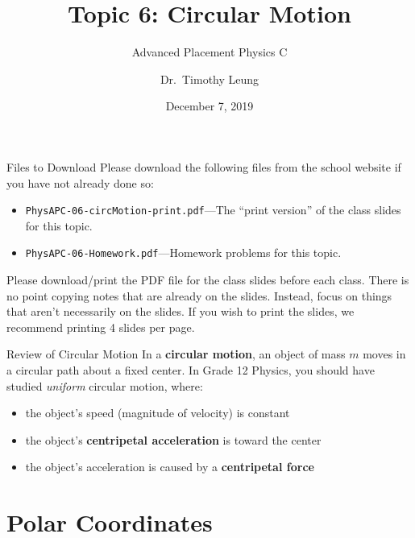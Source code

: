 \documentclass[12pt,compress,aspectratio=169]{beamer}
\title{Topic 6: Circular Motion}
\subtitle{Advanced Placement Physics C}
\author[TML]{Dr.\ Timothy Leung}
\institute{Olympiads School}
\date{December 7, 2019}
\begin{document}
\begin{frame}
  \maketitle
\end{frame}


\begin{frame}{Files to Download}
  Please download the following files from the school website if you have not
  already done so:
  \begin{itemize}
  \item\texttt{PhysAPC-06-circMotion-print.pdf}---The ``print version'' of the
    class slides for this topic.
  \item\texttt{PhysAPC-06-Homework.pdf}---Homework problems for this topic.
  \end{itemize}
  \vspace{.1in}Please download/print the PDF file for the class slides before
  each class. There is no point copying notes that are already on the slides.
  Instead, focus on things that aren't necessarily on the slides. If you wish
  to print the slides, we recommend printing 4 slides per page.
\end{frame}



\begin{frame}{Review of Circular Motion}
  In a \textbf{circular motion}, an object of mass $m$ moves in a circular path
  about a fixed center. In Grade 12 Physics, you should have studied
  \emph{uniform} circular motion, where:
  \begin{itemize}
  \item the object's speed (magnitude of velocity) is constant
  \item the object's \textbf{centripetal acceleration} is toward the center
  \item the object's acceleration is caused by a \textbf{centripetal force}
  \end{itemize}
\end{frame}



\section{Polar Coordinates}
\end{document}
